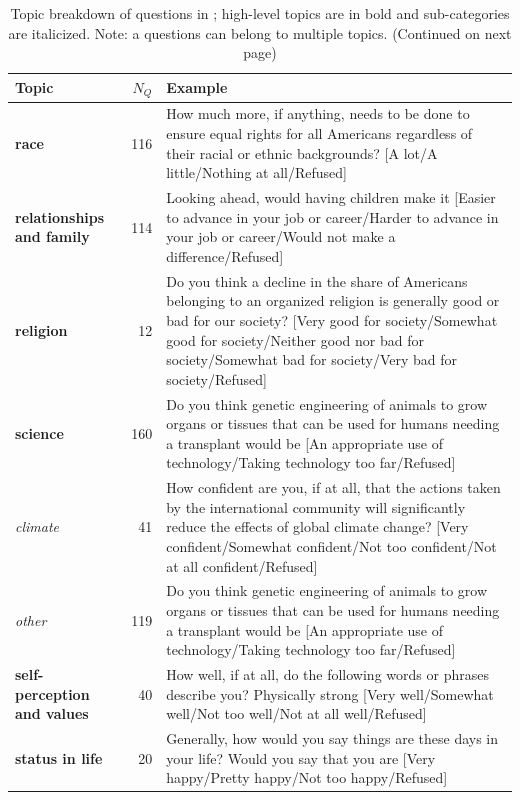 \begin{table}[!h]
    \ContinuedFloat

    \caption{Topic breakdown of questions in \bname{}; high-level topics are in bold and sub-categories are italicized. Note: a questions can belong to multiple topics. (Continued on next page)}    \vskip 0.15in
    \renewcommand{\arraystretch}{1.5}
    \begin{center}
    \begin{small}
   
        \begin{tabular}{lrp{10cm}}
            \toprule
            Topic &  $N_Q$ & Example \\
            \midrule
            \textbf{race} &    116 & How much more, if anything, needs to be done to ensure equal rights for all Americans regardless of their racial or ethnic backgrounds? [A lot/A little/Nothing at all/Refused]\\ \hline
            \textbf{relationships and family} &   114 & Looking ahead, would having children make it [Easier to advance in your job or career/Harder to advance in your job or career/Would not make a difference/Refused] \\ \hline
            \textbf{religion} &    12  & Do you think a decline in the share of Americans belonging to an organized religion is generally good or bad for our society? [Very good for society/Somewhat good for society/Neither good nor bad for society/Somewhat bad for society/Very bad for society/Refused]\\ \hline
            \textbf{science} &   160 & Do you think genetic engineering of animals to grow organs or tissues that can be used for humans needing a transplant would be [An appropriate use of technology/Taking technology too far/Refused]\\
            \textit{climate} &   41 & How confident are you, if at all, that the actions taken by the international community will significantly reduce the effects of global climate change? [Very confident/Somewhat confident/Not too confident/Not at all confident/Refused]\\
            \textit{other} &   119 & Do you think genetic engineering of animals to grow organs or tissues that can be used for humans needing a transplant would be [An appropriate use of technology/Taking technology too far/Refused]\\ \hline
            \textbf{self-perception and values} &    40 & How well, if at all, do the following words or phrases describe you? Physically strong [Very well/Somewhat well/Not too well/Not at all well/Refused]\\ \hline
            \textbf{status in life} &    20 & Generally, how would you say things are these days in your life? Would you say that you are [Very happy/Pretty happy/Not too happy/Refused] \\ \hline
            \bottomrule
            \end{tabular}
    \end{small}
 \end{center}    
 \vskip -0.1in
 \end{table}
 